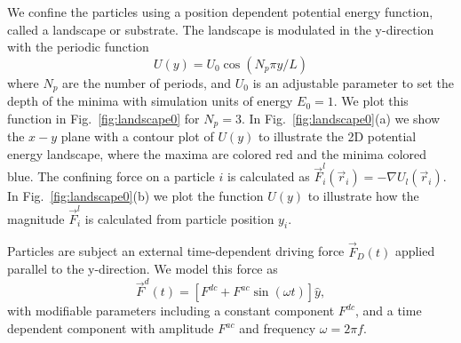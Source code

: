 \documentclass[twocolumn,preprintnumbers,amsmath,amssymb,aps,prx]{revtex4}
\begin{document}
We confine the particles using a position dependent 
potential energy function, called a landscape or substrate.
% 
The landscape is modulated in the y-direction
with the periodic function 
 \begin{equation}
   U(y) = U_0 \cos{(N_p \pi y / L)}
     \label{eq:ysubstrate}
\end{equation}
 where $N_p$ are the number of periods,
 and $U_0$ is an adjustable parameter
 to set the depth of the minima
 with simulation units of energy $E_0 = 1$. 
 We plot this function in 
 Fig.~\ref{fig:landscape0}
 for $N_p = 3$. %
 In Fig.~\ref{fig:landscape0}(a) we show 
 the $x-y$ plane with a contour plot of $U(y)$ %
 to illustrate
 the 2D potential energy landscape,
 where 
 the maxima are colored red and the minima colored blue.
 The confining force on a particle $i$
 is calculated as 
 $\vec{F}^{l}_i(\vec{r}_i) = -\nabla U_l(\vec{r}_i)$.
 In Fig.~\ref{fig:landscape0}(b) we plot the function
 $U(y)$ to illustrate how the magnitude
 $\vec{F}^{l}_i$ is calculated from particle position $y_i$.  

 
 Particles are subject an external time-dependent driving force
$\vec{F}_{D}(t)$
applied parallel to the y-direction.
We model this force as
\begin{equation}
  \vec{F}^{d}(t) = [F^{dc} + F^{ac} \sin(\omega t)] \hat{y},
    \label{eq:drive}
\end{equation}
with modifiable parameters including
a constant component $F^{dc}$,
and a time dependent component with amplitude $F^{ac}$
and frequency $\omega = 2 \pi f$.
\end{document}
